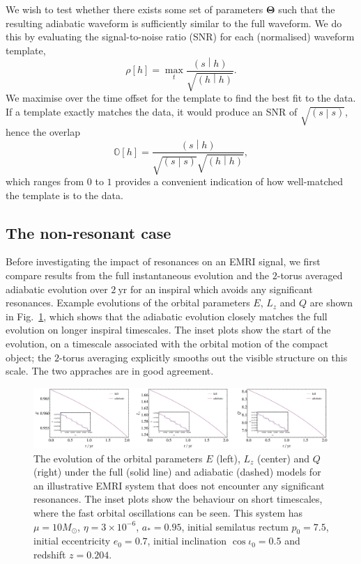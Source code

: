 \documentclass[aps,prd,amsfonts,amssymb,amsmath,nofootinbib,showpacs,superscriptaddress,twocolumn,floatfix]{revtex4-1}
\newcommand{\figref}[1]{Fig.~\ref{fig:#1}}
\newcommand{\overlap}[2]{\ensuremath{\left(#1\middle|#2\right)}}
\begin{document}
We wish to test whether there exists some set of parameters $\boldsymbol{\Theta}$ such that the resulting adiabatic waveform is sufficiently similar to the full waveform. We do this by evaluating the signal-to-noise ratio (SNR) for each (normalised) waveform template,
\begin{equation}
\rho\left[h\right] = \max_t \frac{\overlap{s}{h}}{\sqrt{\overlap{h}{h}}}.
\end{equation}
We maximise over the time offset for the template to find the best fit to the data. If a template exactly matches the data, it would produce an SNR of $\sqrt{\overlap{s}{s}}$, hence the overlap
\begin{equation}
\label{eq:overlap}
\mathbb{O}\left[h\right] = \frac{\overlap{s}{h}}{\sqrt{\overlap{s}{s}}\sqrt{\overlap{h}{h}}},
\end{equation}
which ranges from $0$ to $1$ provides a convenient indication of how well-matched the template is to the data.

\subsection{The non-resonant case}
\label{sec:nonres}

Before investigating the impact of resonances on an EMRI signal, we first compare results from the full instantaneous evolution and the $2$-torus averaged adiabatic evolution over $2~\mathrm{yr}$ for an inspiral which avoids any significant resonances. Example evolutions of the orbital parameters $E$, $L_z$ and $Q$ are shown in \figref{good-traj}, which shows that the adiabatic evolution closely matches the full evolution on longer inspiral timescales. The inset plots show the start of the evolution, on a timescale associated with the orbital motion of the compact object; the $2$-torus averaging explicitly smooths out the visible structure on this scale. The two appraches are in good agreement.

\begin{figure}
\centering
\includegraphics[width=\textwidth]{Fig_good_traj}
\caption{\label{fig:good-traj}The evolution of the orbital parameters $E$ (left), $L_z$ (center) and $Q$ (right) under the full (solid line) and adiabatic (dashed) models for an illustrative EMRI system that does not encounter any significant resonances. The inset plots show the behaviour on short timescales, where the fast orbital oscillations can be seen. This system has $\mu = 10 M_{\odot}$, $\eta = 3\times 10^{-6}$, $a_\ast=0.95$, initial semilatus rectum $p_0 = 7.5$, initial eccentricity $e_0 = 0.7$, initial inclination $\cos \iota_0 = 0.5$ and redshift $z=0.204$.}
\end{figure}
\end{document}
